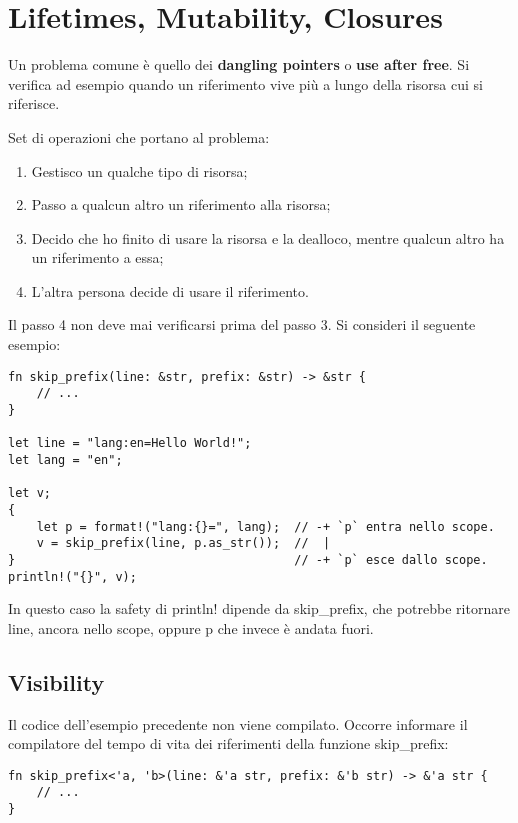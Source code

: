 \newpage
\section{Lifetimes, Mutability, Closures}

Un problema comune è quello dei \textbf{dangling pointers} o
\textbf{use after free}.
Si verifica ad esempio quando un riferimento vive più a lungo della risorsa
cui si riferisce.

Set di operazioni che portano al problema:

\begin{enumerate}
\item Gestisco un qualche tipo di risorsa;
\item Passo a qualcun altro un riferimento alla risorsa;
\item Decido che ho finito di usare la risorsa e la dealloco, mentre qualcun
altro ha un riferimento a essa;
\item L’altra persona decide di usare il riferimento.
\end{enumerate}

Il passo 4 non deve mai verificarsi prima del passo 3. Si consideri il seguente
esempio:

\begin{lstlisting}
fn skip_prefix(line: &str, prefix: &str) -> &str {
    // ...
}

let line = "lang:en=Hello World!";
let lang = "en";

let v;
{
    let p = format!("lang:{}=", lang);  // -+ `p` entra nello scope.
    v = skip_prefix(line, p.as_str());  //  |
}                                       // -+ `p` esce dallo scope.
println!("{}", v);
\end{lstlisting}

In questo caso la safety di println! dipende da skip\_prefix, che potrebbe
ritornare line, ancora nello scope, oppure p che invece è andata fuori.

\subsection{Visibility}

Il codice dell’esempio precedente non viene compilato. Occorre informare il
compilatore del tempo di vita dei riferimenti della funzione skip\_prefix:

\begin{lstlisting}
fn skip_prefix<'a, 'b>(line: &'a str, prefix: &'b str) -> &'a str {
    // ...
}
\end{lstlisting}

